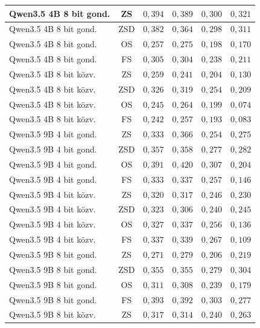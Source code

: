 \documentclass[
]{elteikthesis}[2024/04/26]
\begin{document}
\begin{longtable}{ | l | c | r | r | r | r | }
	\hline
	Qwen3.5 4B 8 bit gond. & ZS & $0{,}394$ & $0{,}389$ & $0{,}300$ & $0{,}321$ \\
	\hline
	Qwen3.5 4B 8 bit gond. & ZSD & $0{,}382$ & $0{,}364$ & $0{,}298$ & $0{,}311$ \\
	\hline
	Qwen3.5 4B 8 bit gond. & OS & $0{,}257$ & $0{,}275$ & $0{,}198$ & $0{,}170$ \\
	\hline
	Qwen3.5 4B 8 bit gond. & FS & $0{,}305$ & $0{,}304$ & $0{,}238$ & $0{,}211$ \\
	\hline
	Qwen3.5 4B 8 bit közv. & ZS & $0{,}259$ & $0{,}241$ & $0{,}204$ & $0{,}130$ \\
	\hline
	Qwen3.5 4B 8 bit közv. & ZSD & $0{,}326$ & $0{,}319$ & $0{,}254$ & $0{,}209$ \\
	\hline
	Qwen3.5 4B 8 bit közv. & OS & $0{,}245$ & $0{,}264$ & $0{,}199$ & $0{,}074$ \\
	\hline
	Qwen3.5 4B 8 bit közv. & FS & $0{,}242$ & $0{,}257$ & $0{,}193$ & $0{,}083$ \\
	\hline
	Qwen3.5 9B 4 bit gond. & ZS & $0{,}333$ & $0{,}366$ & $0{,}254$ & $0{,}275$ \\
	\hline
	Qwen3.5 9B 4 bit gond. & ZSD & $0{,}357$ & $0{,}358$ & $0{,}277$ & $0{,}282$ \\
	\hline
	Qwen3.5 9B 4 bit gond. & OS & $0{,}391$ & $0{,}420$ & $0{,}307$ & $0{,}204$ \\
	\hline
	Qwen3.5 9B 4 bit gond. & FS & $0{,}333$ & $0{,}337$ & $0{,}257$ & $0{,}146$ \\
	\hline
	Qwen3.5 9B 4 bit közv. & ZS & $0{,}320$ & $0{,}317$ & $0{,}246$ & $0{,}230$ \\
	\hline
	Qwen3.5 9B 4 bit közv. & ZSD & $0{,}323$ & $0{,}306$ & $0{,}240$ & $0{,}245$ \\
	\hline
	Qwen3.5 9B 4 bit közv. & OS & $0{,}327$ & $0{,}337$ & $0{,}256$ & $0{,}136$ \\
	\hline
	Qwen3.5 9B 4 bit közv. & FS & $0{,}337$ & $0{,}339$ & $0{,}267$ & $0{,}109$ \\
	\hline
	Qwen3.5 9B 8 bit gond. & ZS & $0{,}271$ & $0{,}279$ & $0{,}206$ & $0{,}219$ \\
	\hline
	Qwen3.5 9B 8 bit gond. & ZSD & $0{,}355$ & $0{,}355$ & $0{,}279$ & $0{,}304$ \\
	\hline
	Qwen3.5 9B 8 bit gond. & OS & $0{,}311$ & $0{,}308$ & $0{,}239$ & $0{,}179$ \\
	\hline
	Qwen3.5 9B 8 bit gond. & FS & $0{,}393$ & $0{,}392$ & $0{,}303$ & $0{,}277$ \\
	\hline
	Qwen3.5 9B 8 bit közv. & ZS & $0{,}317$ & $0{,}314$ & $0{,}240$ & $0{,}263$ \\

\end{longtable}
\end{document}

